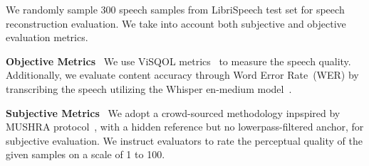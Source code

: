 We randomly sample 300 speech samples from LibriSpeech test set for speech reconstruction evaluation.
We take into account both subjective and objective evaluation metrics.

\textbf{Objective Metrics}~
We use ViSQOL metrics~\citep{6309421} to measure the speech quality. Additionally, we evaluate content accuracy through Word Error Rate~(WER) by transcribing the speech utilizing the Whisper en-medium model~\citep{radford2023robust}.

\textbf{Subjective Metrics}~
 We adopt a crowd-sourced methodology inpspired by MUSHRA protocol~\citep{series2014method}, with a hidden reference but no lowerpass-filtered anchor, for subjective evaluation. We instruct evaluators to rate the perceptual quality of the given samples on a scale of 1 to 100. 



